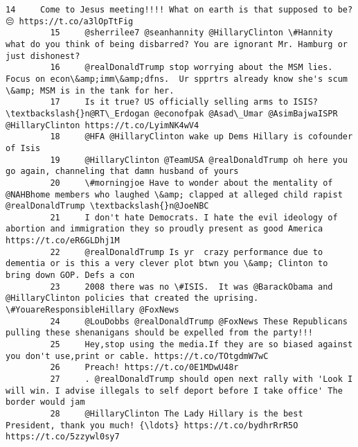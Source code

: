 \documentclass[11pt]{article}
\begin{document}
\begin{Verbatim}[commandchars=\\\{\}]
         14     Come to Jesus meeting!!!! What on earth is that supposed to be? 😔 https://t.co/a3lOpTtFig                                                                  
         15     @sherrilee7 @seanhannity @HillaryClinton \#Hannity what do you think of being disbarred? You are ignorant Mr. Hamburg or just dishonest?                    
         16     @realDonaldTrump stop worrying about the MSM lies. Focus on econ\&amp;imm\&amp;dfns.  Ur spprtrs already know she's scum \&amp; MSM is in the tank for her.   
         17     Is it true? US officially selling arms to ISIS?\textbackslash{}n@RT\_Erdogan @econofpak @Asad\_Umar @AsimBajwaISPR @HillaryClinton https://t.co/LyimNK4wV4                  
         18     @HFA @HillaryClinton wake up Dems Hillary is cofounder of Isis                                                                                             
         19     @HillaryClinton @TeamUSA @realDonaldTrump oh here you go again, channeling that damn husband of yours                                                      
         20     \#morningjoe Have to wonder about the mentality of @NAHBhome members who laughed \&amp; clapped at alleged child rapist @realDonaldTrump \textbackslash{}n@JoeNBC           
         21     I don't hate Democrats. I hate the evil ideology of abortion and immigration they so proudly present as good America https://t.co/eR6GLDhj1M               
         22     @realDonaldTrump Is yr  crazy performance due to dementia or is this a very clever plot btwn you \&amp; Clinton to bring down GOP. Defs a con               
         23     2008 there was no \#ISIS.  It was @BarackObama and @HillaryClinton policies that created the uprising. \#YouareResponsibleHillary @FoxNews                   
         24     @LouDobbs @realDonaldTrump @FoxNews These Republicans pulling these shenanigans should be expelled from the party!!!                                       
         25     Hey,stop using the media.If they are so biased against you don't use,print or cable. https://t.co/TOtgdmW7wC                                               
         26     Preach! https://t.co/0E1MDwU48r                                                                                                                            
         27     . @realDonaldTrump should open next rally with 'Look I will win. I advise illegals to self deport before I take office' The border would jam               
         28     @HillaryClinton The Lady Hillary is the best President, thank you much! {\ldots} https://t.co/bydhrRrR5O https://t.co/5zzywl0sy7                                

\end{Verbatim}
\end{document}
